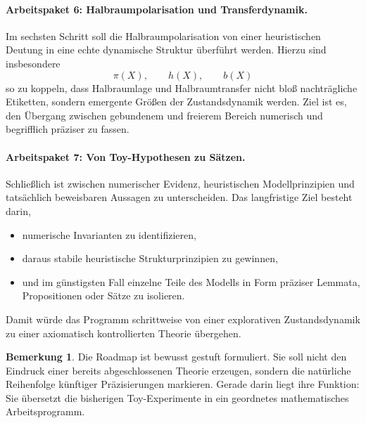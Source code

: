 \documentclass[11pt,a4paper]{article}
\theoremstyle{definition}
\newtheorem{bemerkung}{Bemerkung}
\begin{document}
\paragraph{Arbeitspaket 6: Halbraumpolarisation und Transferdynamik.}
Im sechsten Schritt soll die Halbraumpolarisation von einer heuristischen Deutung in eine echte dynamische Struktur überführt werden. Hierzu sind insbesondere
\[
\pi(X),\qquad h(X),\qquad b(X)
\]
so zu koppeln, dass Halbraumlage und Halbraumtransfer nicht bloß nachträgliche Etiketten, sondern emergente Größen der Zustandsdynamik werden. Ziel ist es, den Übergang zwischen gebundenem und freierem Bereich numerisch und begrifflich präziser zu fassen.

\paragraph{Arbeitspaket 7: Von Toy-Hypothesen zu Sätzen.}
Schließlich ist zwischen numerischer Evidenz, heuristischen Modellprinzipien und tatsächlich beweisbaren Aussagen zu unterscheiden. Das langfristige Ziel besteht darin,
\begin{itemize}
	\item numerische Invarianten zu identifizieren,
	\item daraus stabile heuristische Strukturprinzipien zu gewinnen,
	\item und im günstigsten Fall einzelne Teile des Modells in Form präziser Lemmata, Propositionen oder Sätze zu isolieren.
\end{itemize}
Damit würde das Programm schrittweise von einer explorativen Zustandsdynamik zu einer axiomatisch kontrollierten Theorie übergehen.

\begin{bemerkung}
	Die Roadmap ist bewusst gestuft formuliert. Sie soll nicht den Eindruck einer bereits abgeschlossenen Theorie erzeugen, sondern die natürliche Reihenfolge künftiger Präzisierungen markieren. Gerade darin liegt ihre Funktion: Sie übersetzt die bisherigen Toy-Experimente in ein geordnetes mathematisches Arbeitsprogramm.
\end{bemerkung}
\end{document}
